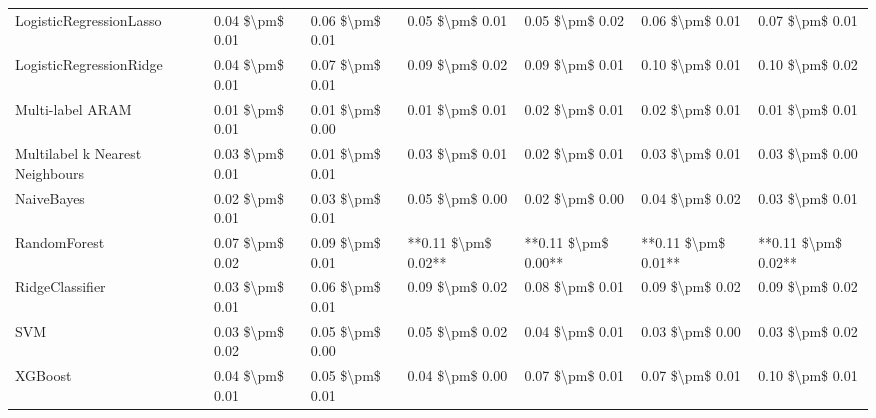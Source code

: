 \begin{tabular}{lllllll}
LogisticRegressionLasso         &  0.04 \$\textbackslash pm\$ 0.01 &           0.06 \$\textbackslash pm\$ 0.01 &       0.05 \$\textbackslash pm\$ 0.01 &        0.05 \$\textbackslash pm\$ 0.02 &                         0.06 \$\textbackslash pm\$ 0.01 &      0.07 \$\textbackslash pm\$ 0.01 \\
LogisticRegressionRidge         &  0.04 \$\textbackslash pm\$ 0.01 &           0.07 \$\textbackslash pm\$ 0.01 &       0.09 \$\textbackslash pm\$ 0.02 &        0.09 \$\textbackslash pm\$ 0.01 &                         0.10 \$\textbackslash pm\$ 0.01 &      0.10 \$\textbackslash pm\$ 0.02 \\
Multi-label ARAM                &  0.01 \$\textbackslash pm\$ 0.01 &           0.01 \$\textbackslash pm\$ 0.00 &       0.01 \$\textbackslash pm\$ 0.01 &        0.02 \$\textbackslash pm\$ 0.01 &                         0.02 \$\textbackslash pm\$ 0.01 &      0.01 \$\textbackslash pm\$ 0.01 \\
Multilabel k Nearest Neighbours &  0.03 \$\textbackslash pm\$ 0.01 &           0.01 \$\textbackslash pm\$ 0.01 &       0.03 \$\textbackslash pm\$ 0.01 &        0.02 \$\textbackslash pm\$ 0.01 &                         0.03 \$\textbackslash pm\$ 0.01 &      0.03 \$\textbackslash pm\$ 0.00 \\
NaiveBayes                      &  0.02 \$\textbackslash pm\$ 0.01 &           0.03 \$\textbackslash pm\$ 0.01 &       0.05 \$\textbackslash pm\$ 0.00 &        0.02 \$\textbackslash pm\$ 0.00 &                         0.04 \$\textbackslash pm\$ 0.02 &      0.03 \$\textbackslash pm\$ 0.01 \\
RandomForest                    &  0.07 \$\textbackslash pm\$ 0.02 &           0.09 \$\textbackslash pm\$ 0.01 &   **0.11 \$\textbackslash pm\$ 0.02** &    **0.11 \$\textbackslash pm\$ 0.00** &                     **0.11 \$\textbackslash pm\$ 0.01** &  **0.11 \$\textbackslash pm\$ 0.02** \\
RidgeClassifier                 &  0.03 \$\textbackslash pm\$ 0.01 &           0.06 \$\textbackslash pm\$ 0.01 &       0.09 \$\textbackslash pm\$ 0.02 &        0.08 \$\textbackslash pm\$ 0.01 &                         0.09 \$\textbackslash pm\$ 0.02 &      0.09 \$\textbackslash pm\$ 0.02 \\
SVM                             &  0.03 \$\textbackslash pm\$ 0.02 &           0.05 \$\textbackslash pm\$ 0.00 &       0.05 \$\textbackslash pm\$ 0.02 &        0.04 \$\textbackslash pm\$ 0.01 &                         0.03 \$\textbackslash pm\$ 0.00 &      0.03 \$\textbackslash pm\$ 0.02 \\
XGBoost                         &  0.04 \$\textbackslash pm\$ 0.01 &           0.05 \$\textbackslash pm\$ 0.01 &       0.04 \$\textbackslash pm\$ 0.00 &        0.07 \$\textbackslash pm\$ 0.01 &                         0.07 \$\textbackslash pm\$ 0.01 &      0.10 \$\textbackslash pm\$ 0.01 \\
\bottomrule
\end{tabular}
